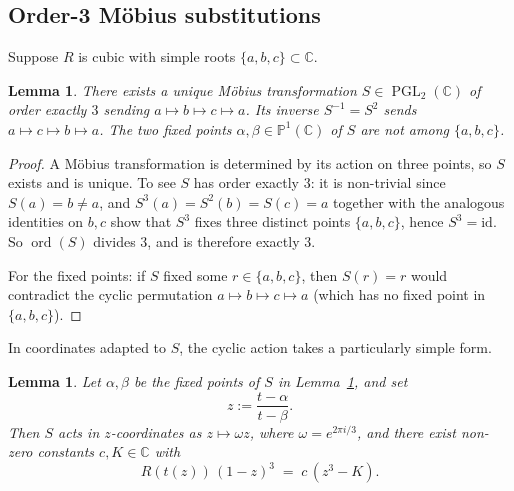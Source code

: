 \documentclass[11pt,a4paper]{article}
\theoremstyle{plain}
\newtheorem{lemma}[theorem]{Lemma}
\theoremstyle{definition}
\theoremstyle{remark}
\newcommand{\C}{\mathbb{C}}
\newcommand{\PGL}{\operatorname{PGL}}
\begin{document}
\subsection{Order-3 M\"obius substitutions}

Suppose $R$ is cubic with simple roots $\{a,b,c\}\subset\C$.

\begin{lemma}\label{lem:cyclic-mobius}
There exists a unique M\"obius transformation $S\in\PGL_2(\C)$ of order exactly $3$ sending $a\mapsto b\mapsto c\mapsto a$. Its inverse $S^{-1}=S^2$ sends $a\mapsto c\mapsto b\mapsto a$. The two fixed points $\alpha,\beta\in\mathbb{P}^1(\C)$ of $S$ are not among $\{a,b,c\}$.
\end{lemma}

\begin{proof}
A M\"obius transformation is determined by its action on three points, so $S$ exists and is unique. To see $S$ has order exactly $3$: it is non-trivial since $S(a)=b\neq a$, and $S^3(a)=S^2(b)=S(c)=a$ together with the analogous identities on $b,c$ show that $S^3$ fixes three distinct points $\{a,b,c\}$, hence $S^3=\mathrm{id}$. So $\operatorname{ord}(S)$ divides $3$, and is therefore exactly $3$.

For the fixed points: if $S$ fixed some $r\in\{a,b,c\}$, then $S(r)=r$ would contradict the cyclic permutation $a\mapsto b\mapsto c\mapsto a$ (which has no fixed point in $\{a,b,c\}$).
\end{proof}

In coordinates adapted to $S$, the cyclic action takes a particularly simple form.

\begin{lemma}\label{lem:cyclic-canonical}
Let $\alpha,\beta$ be the fixed points of $S$ in Lemma~\ref{lem:cyclic-mobius}, and set
\[
  z := \frac{t-\alpha}{t-\beta}.
\]
Then $S$ acts in $z$-coordinates as $z\mapsto \omega z$, where $\omega=e^{2\pi i/3}$, and there exist non-zero constants $c,K\in\C$ with
\begin{equation}\label{eq:R-as-z3-K}
  R(t(z))\,(1-z)^3 \;=\; c\,(z^3 - K).
\end{equation}
\end{lemma}
\end{document}

